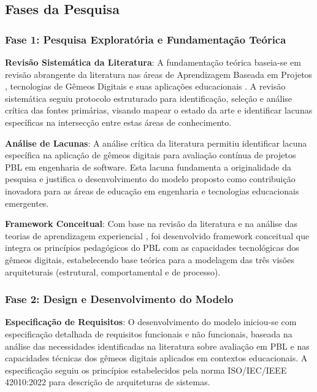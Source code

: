 \documentclass[12pt,a4paper]{article}
\renewcommand{\cite}[1]{}
\begin{document}
\subsection{Fases da Pesquisa}

\subsubsection{Fase 1: Pesquisa Exploratória e Fundamentação Teórica}

\textbf{Revisão Sistemática da Literatura}: A fundamentação teórica baseia-se em revisão abrangente da literatura nas áreas de Aprendizagem Baseada em Projetos \cite{thomas2000, savery2015, hmelo2004}, tecnologias de Gêmeos Digitais \cite{grieves2014, tao2018, barricelli2019} e suas aplicações educacionais \cite{bachmann2023, silveira2024panorama}. A revisão sistemática seguiu protocolo estruturado para identificação, seleção e análise crítica das fontes primárias, visando mapear o estado da arte e identificar lacunas específicas na intersecção entre estas áreas de conhecimento.

\textbf{Análise de Lacunas}: A análise crítica da literatura permitiu identificar lacuna específica na aplicação de gêmeos digitais para avaliação contínua de projetos PBL em engenharia de software. Esta lacuna fundamenta a originalidade da pesquisa e justifica o desenvolvimento do modelo proposto como contribuição inovadora para as áreas de educação em engenharia e tecnologias educacionais emergentes.

\textbf{Framework Conceitual}: Com base na revisão da literatura e na análise das teorias de aprendizagem experiencial \cite{kolb1984}, foi desenvolvido framework conceitual que integra os princípios pedagógicos do PBL \cite{duch2001} com as capacidades tecnológicas dos gêmeos digitais, estabelecendo base teórica para a modelagem das três visões arquiteturais (estrutural, comportamental e de processo).

\subsubsection{Fase 2: Design e Desenvolvimento do Modelo}

\textbf{Especificação de Requisitos}: O desenvolvimento do modelo iniciou-se com especificação detalhada de requisitos funcionais e não funcionais, baseada na análise das necessidades identificadas na literatura sobre avaliação em PBL \cite{guo2020, lavado2024} e nas capacidades técnicas dos gêmeos digitais aplicados em contextos educacionais. A especificação seguiu os princípios estabelecidos pela norma ISO/IEC/IEEE 42010:2022 \cite{iso42010} para descrição de arquiteturas de sistemas.
\end{document}
